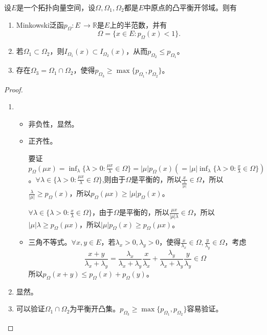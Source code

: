 \begin{theorem}
	设$E$是一个拓扑向量空间，设$\Omega,\Omega_{1},\Omega_{2} $都是$E $中原点的凸平衡开邻域。则有
	\begin{enumerate}
		\item Minkowski泛函$p_{\Omega}:E\, \rightarrow \mathbb{R} $是$E$上的半范数，并有
		\begin{equation*}
			\Omega=\{x\in E:p_{\Omega}(x)<1\}.
		\end{equation*}
		
		\item 若$\Omega_{1}\subset \Omega_{2} $，则$I_{\Omega_{1}}(x)\subset I_{\Omega_{2}}(x) $，从而$p_{\Omega_{2}}\leq p_{\Omega_{1}} $。
		
		\item 存在$\Omega_{3}=\Omega_{1}\cap\Omega_{2} $，使得$p_{\Omega_{3}}\geq \max \{p_{\Omega_{1}},p_{\Omega_{2}}\} $。
	\end{enumerate}
\end{theorem}

\begin{proof}
	\begin{enumerate}
		\item \begin{itemize}
			\item 非负性，显然。
			\item 正齐性。\par
			要证$p_{\Omega}(\mu x) =\inf_{\lambda}\{\lambda>0:\frac{\mu x}{\lambda}\in \Omega \}=|\mu|p_{\Omega}(x)(=|\mu|\inf_{\lambda}\{\lambda>0:\frac{x}{\lambda}\in \Omega\})$。$\forall \lambda \in \{\lambda>0: \frac{\mu x}{\lambda}\in \Omega\} $,则由于$\Omega $是平衡的，所以$\frac{x}{\frac{\lambda}{|\mu|}} \in \Omega$，所以$\frac{\lambda}{|\mu|} \geq p_{\Omega}(x)$，所以$p_{\Omega}(\mu x)\geq |\mu|p_{\Omega}(x) $。\par
			$\forall \lambda\in \{\lambda>0:\frac{x}{\lambda}\in \Omega\} $，由于$\Omega $是平衡的，所以$\frac{\mu x}{|\mu|\lambda}\in \Omega $，所以$|\mu|\lambda\geq p_{\Omega}(\mu x) $，所以$|\mu|p_{\Omega}(x)\geq p_{\Omega}(\mu x) $。
			\item 三角不等式。$\forall x,y\in E $，若$\lambda_{x}>0,\lambda_{y}>0$，使得$\frac{x}{\lambda_{x}}\in \Omega,\frac{y}{\lambda_{y}}\in \Omega $，考虑
			\begin{equation*}
				\frac{x+y}{\lambda_{x}+\lambda_{y}}=\frac{\lambda_{x}}{\lambda_{x}+\lambda_{y}}\frac{x}{\lambda_{x}}+\frac{\lambda_{y}}{\lambda_{x}+\lambda_{y}}\frac{y}{\lambda_{y}}\in \Omega
			\end{equation*}
		所以$p_{\Omega}(x+y)\leq p_{\Omega}(x)+p_{\Omega}(y) $。
		\end{itemize}
	\item 显然。
	\item 可以验证$\Omega_{1}\cap\Omega_{2} $为平衡开凸集。$p_{\Omega_{3}}\geq\max\{p_{\Omega_{1}},p_{\Omega_{2}}\} $容易验证。
	\end{enumerate}
\end{proof}










